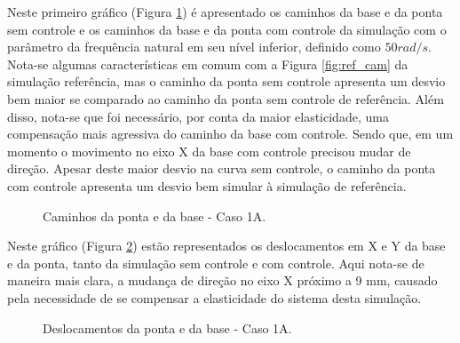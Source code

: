 
Neste primeiro gráfico (Figura \ref{fig:1A_cam}) é apresentado os caminhos da base e da ponta sem controle e os caminhos da base e da ponta com controle da simulação com o parâmetro da frequência natural em seu nível inferior, definido como \(50 rad/s\). Nota-se algumas características em comum com a Figura \ref{fig:ref_cam} da simulação referência, mas o caminho da ponta sem controle apresenta um desvio bem maior se comparado ao caminho da ponta sem controle de referência. Além disso, nota-se que foi necessário, por conta da maior elasticidade, uma compensação mais agressiva do caminho da base com controle. Sendo que, em um momento o movimento no eixo X da base com controle precisou mudar de direção. Apesar deste maior desvio na curva sem controle, o caminho da ponta com controle apresenta um desvio bem simular à simulação de referência.

\begin{figure}[H]
    \centering
    \hfill
    \hfill
    \hfill
    \caption{Caminhos da ponta e da base - Caso 1A.}
    \label{fig:1A_cam}
\end{figure}

Neste gráfico (Figura \ref{fig:1A_des}) estão representados os deslocamentos em X e Y da base e da ponta, tanto da simulação sem controle e com controle. Aqui nota-se de maneira mais clara, a mudança de direção no eixo X próximo a 9 mm, causado pela necessidade de se compensar a elasticidade do sistema desta simulação.

\begin{figure}[H]
    \centering
    \hfill
    \caption{Deslocamentos da ponta e da base - Caso 1A.}
    \label{fig:1A_des}
\end{figure}

